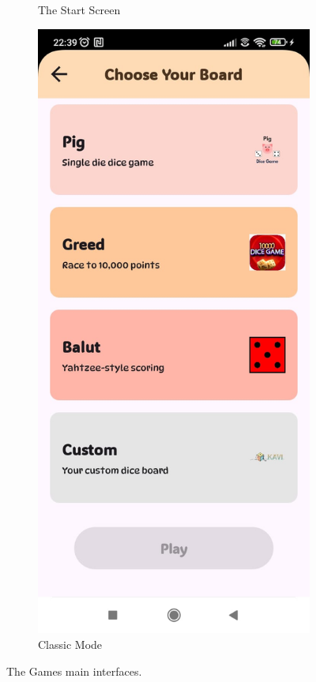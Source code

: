 \begin{figure}[ht!]
\begin{subfigure}[b]{0.27\textwidth}
        \caption{The Start Screen}
        \label{fig:start_screen}
    \end{subfigure}
    \hfill
    \begin{subfigure}[b]{0.27\textwidth}
        \includegraphics[width=\textwidth]{img/classic boards.jpg}
        \caption{Classic Mode}
        \label{fig:board_screen}
    \end{subfigure}
\caption{The Games main interfaces.}
\label{fig:interface_mode}
\end{figure}


